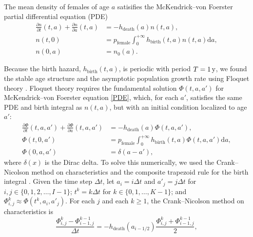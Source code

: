 \documentclass[12pt]{article}
\newcommand{\md}{\mathrm{d}}
\begin{document}
The mean density of females of age $a$ satisifies the McKendrick--von
Foerster partial differential equation (PDE)
\begin{equation}
  \label{PDE}
  \begin{split}
    \frac{\partial n}{\partial t}(t, a)
    + \frac{\partial n}{\partial a}(t, a)
    &= - h_{\text{death}}(a) n(t, a),
    \\
    n(t, 0) &=
    p_{\text{female}}
    \int_0^{+\infty} h_{\text{birth}}(t, a) n(t, a) \md a,
    \\
    n(0, a) &= n_0(a).
  \end{split}
\end{equation}

Because the birth hazard, $h_{\text{birth}}(t, a)$,
is periodic with period $T = \unit[1]{y}$,
we found the stable age structure and the asymptotic population growth
rate using Floquet theory \autocite{parker_1992}.
Floquet theory requires the fundamental solution $\Phi(t, a, a')$ for
McKendrick--von Foerster equation \eqref{PDE}, which, for each $a'$,
satisfies the same PDE and birth integral as
$n(t, a)$, but with an initial condition localized to age $a'$:
\begin{equation}
  \label{fundamental_PDE}
  \begin{split}
    \frac{\partial \Phi}{\partial t}(t, a, a')
    + \frac{\partial \Phi}{\partial a}(t, a, a')
    &= - h_{\text{death}}(a) \Phi(t, a, a'),
    \\
    \Phi(t, 0, a') &=
    p_{\text{female}}
    \int_0^{+\infty} h_{\text{birth}}(t, a) \Phi(t, a, a') \md a,
    \\
    \Phi(0, a, a') &= \delta(a - a'),
  \end{split}
\end{equation}
where $\delta(x)$ is the Dirac delta.
To solve this numerically, we used the
Crank--Nicolson method on characteristics and the composite trapezoid
rule for the birth integral \autocite{milner_1992}.  Given the time
step $\Delta t$,
let $a_i = i \Delta t$
and $a'_j = j \Delta t$
for $i, j \in \{0, 1, 2, \ldots, I - 1\}$;
$t^k = k \Delta t$
for $k \in \{0, 1, \ldots, K - 1\}$;
and $\Phi_{i, j}^k \approx \Phi(t^k, a_i, a'_j)$.
For each $j$ and each $k \geq 1$, the Crank--Nicolson method on
characteristics is
\begin{equation}
  \label{CN_step}
  \frac{\Phi_{i, j}^k - \Phi_{i - 1, j}^{k - 1}}{\Delta t}
  = - h_{\text{death}}(a_{i - 1 / 2})
  \frac{\Phi_{i, j}^k + \Phi_{i - 1, j}^{k - 1}}{2},
\end{equation}
\end{document}
